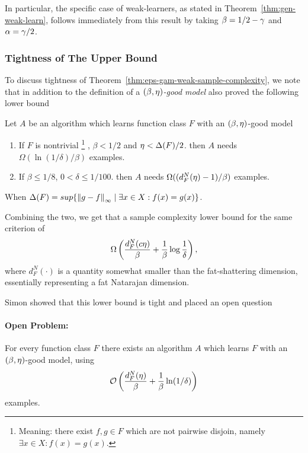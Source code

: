 \documentclass[12pt,a4paper,oneside,onecolumn]{book}
\begin{document}
In particular, the specific case of weak-learners,
as stated in Theorem~\ref{thm:gen-weak-learn},
follows immediately from this result by taking $\beta = 1/2 - \gamma$ and $\alpha = \gamma/2$.


    

\subsubsection{Tightness of The Upper Bound}
\label{sec:simon-lower-bound}

To discuss tightness of Theorem~\ref{thm:eps-gam-weak-sample-complexity}, we note that
in addition to the definition of a \emph{$(\beta,\eta)$-good model}
\citet{DBLP:journals/siamcomp/Simon97} also proved the following lower bound
\begin{theorem}
  Let $A$ be an algorithm which learns function class $F$ with an
  $(\beta, \eta)$-good model
  \begin{enumerate}
  \item If $F$ is nontrivial
    \footnote{Meaning: there exist $f,g \in F$
      which are not pairwise disjoin, namely
      $\exists x\in X: f(x) = g(x)$.
    }
    , $\beta < 1/2$ and $\eta < \Delta(F)/2$.
    then $A$ needs $\Omega(\ln(1/\delta)/\beta)$ examples.
  \item If $\beta \leq 1/8$, $0 < \delta \leq 1/100$. then $A$ needs
    $\Omega((d_F^N(\eta) - 1)/\beta)$ examples.
  \end{enumerate}  
\end{theorem}

When
$ \Delta(F) = sup\{\left\Vert g - f \right\Vert_\infty \mid \exists x \in X : f(x) = g(x)\}$.

Combining the two, we get that
a sample complexity lower bound 
for the same criterion of 
\begin{equation*}
  \Omega \left( \frac{d_F^N(c \eta)}{\beta} + \frac{1}{\beta}\log\frac{1}{\delta} \right),
\end{equation*}
where $d_F^N(\cdot)$ is a quantity somewhat smaller than the fat-shattering dimension, 
essentially representing a fat Natarajan dimension.

Simon showed that this lower bound is tight and
placed an open question
\paragraph{Open Problem:}
For every function class $F$
there exists an algorithm $A$
which learns $F$ with an
$(\beta, \eta)$-good model,
using
\[\mathcal{O}\left( \frac{d_F^N(\eta)}{\beta} + \frac{1}{\beta}\ln(1/\delta) \right)\]
examples.
\end{document}
